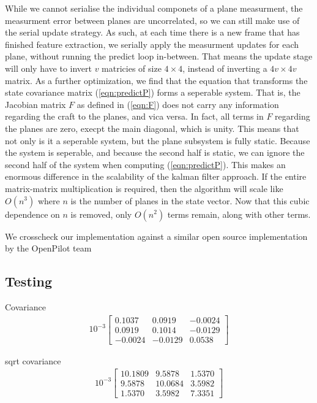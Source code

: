 \documentclass[]{article}
\begin{document}
{While we cannot serialise the individual componets of a plane measurment, the measurment error between planes are uncorrelated, so we can still make use of the serial update strategy. As such, at each time there is a new frame that has finished feature extraction, we serially apply the measurment updates for each plane, without running the predict loop in-between.
That means the update stage will only have to invert $v$ matricies of size $4\times4$, instead of inverting a $4v \times 4v$ matrix. 
As a further optimization, we find that the equation that transforms the state covariance matrix (\ref{eqn:predictP}) forms a seperable system. That is, the Jacobian matrix $F$ as defined in (\ref{eqn:F}) does not carry any information regarding the craft to the planes, and vica versa.
In fact, all terms in $F$ regarding the planes are zero, execpt the main diagonal, which is unity. This means that not only is it a seperable system, but the plane subsystem is fully static.
Because the system is seperable, and because the second half is static, we can ignore the second half of the system when computing (\ref{eqn:predictP}).
This makes an enormous difference in the scalability of the kalman filter approach. If the entire matrix-matrix multiplication is required, then the algorithm will scale like $O(n^3)$ where $n$ is the number of planes in the state vector. Now that this cubic dependence on $n$ is removed, only $O(n^2)$ terms remain, along with other terms.

	We crosscheck our implementation against a similar open source implementation by the OpenPilot team %


\subsection{Testing} %
\label{sub:testing}

Covariance
\begin{align}
	10^{-3}
	\left[
	\begin{matrix}
		0.1037	& 0.0919	& -0.0024 \\
		0.0919	& 0.1014	& -0.0129 \\
		-0.0024	& -0.0129	& 0.0538
	\end{matrix}
	\right]
\end{align}

sqrt covariance
\begin{align}
	10^{-3}
	\left[
	\begin{matrix}
		10.1809	& 9.5878	& 1.5370 \\
		9.5878	& 10.0684	& 3.5982 \\
		1.5370	& 3.5982	& 7.3351
	\end{matrix}
	\right]
\end{align}

}
\end{document}
